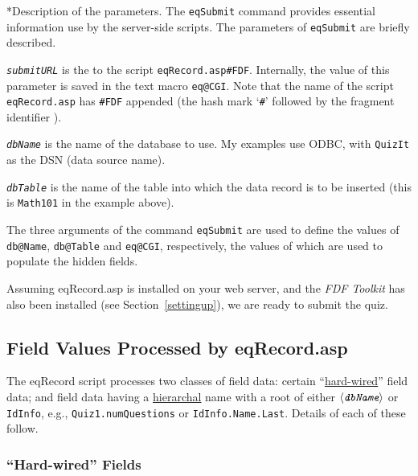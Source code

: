 \documentclass{article}
\makeatletter
\let\bslash=\@backslashchar
\renewcommand{\subparagraph}
    {\@startsection{subparagraph}{5}{\parindent}{6pt}{-3pt}%
    {\normalfont\normalsize\bfseries}}
\def\cs#1{\texttt{\bslash#1}}
\def\anglemeta#1{$\langle\textit{\texttt{#1}}\rangle$}
\def\meta#1{\textit{\texttt{#1}}}
\let\amtIndent\leftmargini
\newenvironment{aebQuote}
   {\list{}{\leftmargin\amtIndent}%
    \item\relax}{\endlist}
\makeatother
\begin{document}
\subparagraph*{Description of the parameters.} The \cs{eqSubmit} command provides essential
information use by the server-side scripts. The parameters of \cs{eqSubmit}
are briefly described.
\begin{aebQuote}
\begin{description}\def\NH{\relax\hspace*{-\labelsep}}%
\item\NH\meta{submitURL} is the {\URL} to the script \texttt{eqRecord.asp\#FDF}.
    Internally, the value of this parameter is saved in the text macro
    \cs{eq@CGI}. Note that the name of the script \texttt{eqRecord.asp} has
    \texttt{\#FDF} appended (the hash mark `\texttt{\#}' followed by the fragment
    identifier {\FDF}).

\item\NH\meta{dbName} is the name of the database to use. My examples use
    ODBC, with \texttt{QuizIt} as the DSN (data source name).

\item\NH\meta{dbTable} is the name of the
table into which the data record is to be inserted (this is \texttt{Math101}
in the example above).
\end{description}
\end{aebQuote}
The three arguments of the command \cs{eqSubmit} are used to define the
values of \cs{db@Name}, \cs{db@Table} and \cs{eq@CGI}, respectively, the
values of which are used to populate the hidden fields.

Assuming \textsf{eqRecord.asp} is installed on your web server, and the
\textsl{FDF Toolkit} has also been installed (see Section~\ref{settingup}),
we are ready to submit the quiz.

\subsection{Field Values Processed by \textsf{eqRecord.asp}}\label{eqRfieldvalues}

The \textsf{eqRecord} script processes two classes of field data: certain
``\hyperref[hardwired]{hard-wired}'' field data; and field data having a
\hyperref[hierarchalfields]{hierarchal} name with a root of either
\anglemeta{dbName} or \texttt{IdInfo}, e.g., \texttt{Quiz1.numQuestions} or
\texttt{IdInfo.Name.Last}. Details of each of these follow.

\subsubsection{``Hard-wired'' Fields}\label{hardwired}
\end{document}
